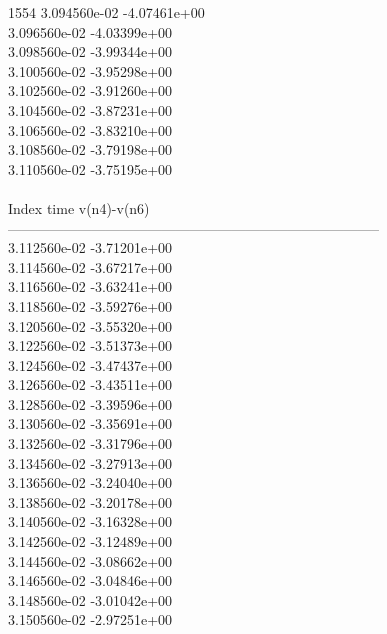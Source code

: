 1554	3.094560e-02	-4.07461e+00	\\ 	3.096560e-02	-4.03399e+00	\\ 	3.098560e-02	-3.99344e+00	\\ 	3.100560e-02	-3.95298e+00	\\ 	3.102560e-02	-3.91260e+00	\\ 	3.104560e-02	-3.87231e+00	\\ 	3.106560e-02	-3.83210e+00	\\ 	3.108560e-02	-3.79198e+00	\\ 	3.110560e-02	-3.75195e+00	\\ \hline
\\ \hline
Index   time            v(n4)-v(n6)     \\ \hline
--------------------------------------------------------------------------------\\ 	3.112560e-02	-3.71201e+00	\\ 	3.114560e-02	-3.67217e+00	\\ 	3.116560e-02	-3.63241e+00	\\ 	3.118560e-02	-3.59276e+00	\\ 	3.120560e-02	-3.55320e+00	\\ 	3.122560e-02	-3.51373e+00	\\ 	3.124560e-02	-3.47437e+00	\\ 	3.126560e-02	-3.43511e+00	\\ 	3.128560e-02	-3.39596e+00	\\ 	3.130560e-02	-3.35691e+00	\\ 	3.132560e-02	-3.31796e+00	\\ 	3.134560e-02	-3.27913e+00	\\ 	3.136560e-02	-3.24040e+00	\\ 	3.138560e-02	-3.20178e+00	\\ 	3.140560e-02	-3.16328e+00	\\ 	3.142560e-02	-3.12489e+00	\\ 	3.144560e-02	-3.08662e+00	\\ 	3.146560e-02	-3.04846e+00	\\ 	3.148560e-02	-3.01042e+00	\\ 	3.150560e-02	-2.97251e+00	\\ \hline
